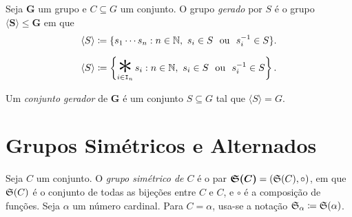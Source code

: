 \begin{defi}
Seja $\bm G$ um grupo e $C \subseteq G$ um conjunto. O grupo \emph{gerado} por $S$ é o grupo $\bm{\langle S \rangle} \leq \bm G$ em que
	\begin{equation*}
	\langle S \rangle \coloneqq \{s_1 \cdots s_n : n \in \mathbb{N},\ s_i \in S \text{\ \ ou\ \ } s_i^{-1} \in S\}.
	\end{equation*}
	
	\begin{equation*}
	\langle S \rangle \coloneqq \left\{\bigopb_{i \in \inte_n} s_i : n \in \N,\ s_i \in S \ou s_i\inv \in S\right\}.
	\end{equation*}



Um \emph{conjunto gerador} de $\bm G$ é um conjunto $S \subseteq G$ tal que $\langle S \rangle = G$.
\end{defi}










\section{Grupos Simétricos e Alternados}

\begin{defi}
	Seja $C$ um conjunto. O \emph{grupo simétrico de $C$} é o par $\bm{\mathfrak{S}(C)} = (\mathfrak{S}(C),\circ)$, em que $\mathfrak{S}(C)$ é o conjunto de todas as bijeções entre $C$ e $C$, e $\circ$ é a composição de funções. Seja $\alpha$ um número cardinal. Para $C = \alpha$, usa-se a notação $\mathfrak{S}_{\alpha} \coloneqq \mathfrak{S}(\alpha)$.
\end{defi}

